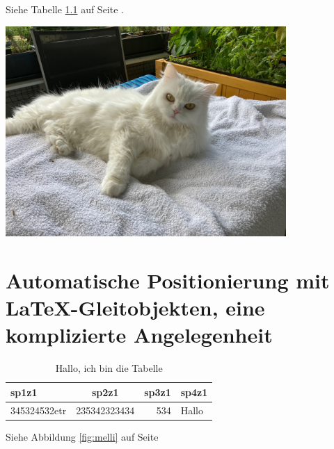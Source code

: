 \documentclass[12pt,ngerman,parskip=half]{scrreprt}
\begin{document}
Siehe Tabelle \ref{tab:erstetab} auf Seite \pageref{tab:erstetab}.

\begin{center}
\includegraphics[width=0.8\textwidth]{Bilder/Katze1}
\end{center}

\chapter[Automatische Positionierung]{Automatische Positionierung mit \LaTeX-Gleitobjekten, eine komplizierte Angelegenheit}

\blindtext 

\blindtext 

\blindtext 

\begin{table}
\caption{Hallo, ich bin die Tabelle}\label{tab:erstetab}
\begin{tabular}{|l|c|r|p{8cm}|} \hline
sp1z1 & sp2z1 & sp3z1 & sp4z1 \\ \hline
345324532etr  & 235342323434 & 534 & Hallo  \\ \hline
\end{tabular}
\end{table}

\blindtext 

\blindtext 

Siehe Abbildung \ref{fig:melli} auf Seite \pageref{fig:melli}

\blindtext 
\end{document}
